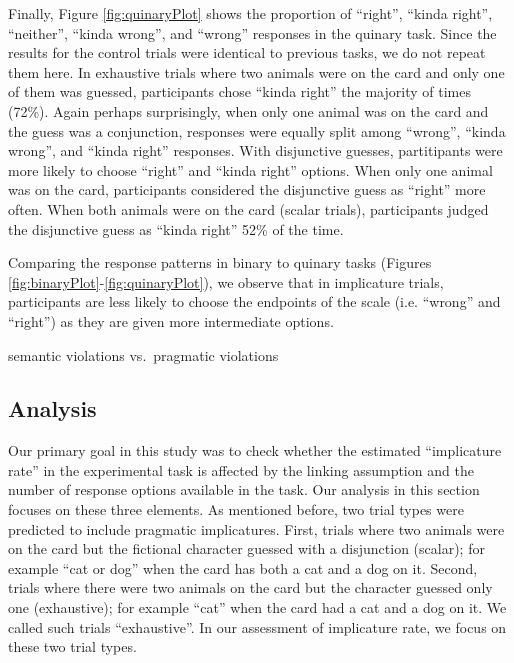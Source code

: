 \documentclass[floatsintext,man]{apa6}
\theoremstyle{definition}
\theoremstyle{definition}
\theoremstyle{definition}
\theoremstyle{remark}
\begin{document}
Finally, Figure \ref{fig:quinaryPlot} shows the proportion of
\enquote{right}, \enquote{kinda right}, \enquote{neither},
\enquote{kinda wrong}, and \enquote{wrong} responses in the quinary
task. Since the results for the control trials were identical to
previous tasks, we do not repeat them here. In exhaustive trials where
two animals were on the card and only one of them was guessed,
participants chose \enquote{kinda right} the majority of times (72\%).
Again perhaps surprisingly, when only one animal was on the card and the
guess was a conjunction, responses were equally split among
\enquote{wrong}, \enquote{kinda wrong}, and \enquote{kinda right}
responses. With disjunctive guesses, partitipants were more likely to
choose \enquote{right} and \enquote{kinda right} options. When only one
animal was on the card, participants considered the disjunctive guess as
\enquote{right} more often. When both animals were on the card (scalar
trials), participants judged the disjunctive guess as \enquote{kinda
right} 52\% of the time.

Comparing the response patterns in binary to quinary tasks (Figures
\ref{fig:binaryPlot}-\ref{fig:quinaryPlot}), we observe that in
implicature trials, participants are less likely to choose the endpoints
of the scale (i.e. \enquote{wrong} and \enquote{right}) as they are
given more intermediate options.

semantic violations vs.~pragmatic violations

\subsection{Analysis}\label{analysis}

Our primary goal in this study was to check whether the estimated
\enquote{implicature rate} in the experimental task is affected by the
linking assumption and the number of response options available in the
task. Our analysis in this section focuses on these three elements. As
mentioned before, two trial types were predicted to include pragmatic
implicatures. First, trials where two animals were on the card but the
fictional character guessed with a disjunction (scalar); for example
\enquote{cat or dog} when the card has both a cat and a dog on it.
Second, trials where there were two animals on the card but the
character guessed only one (exhaustive); for example \enquote{cat} when
the card had a cat and a dog on it. We called such trials
\enquote{exhaustive}. In our assessment of implicature rate, we focus on
these two trial types.
\end{document}
